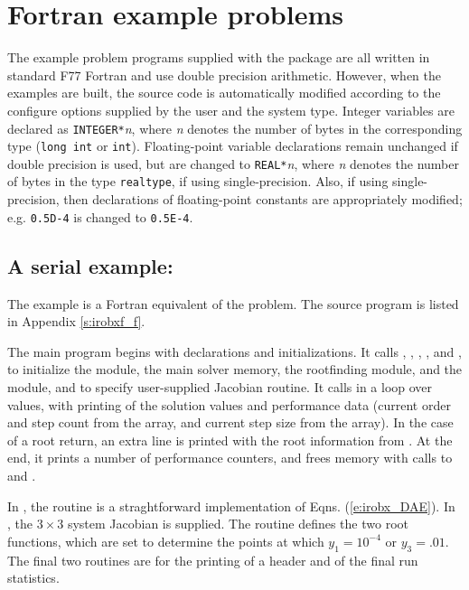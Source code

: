 \section{Fortran example problems}\label{s:ex_fortran}

The {\F} example problem programs supplied with the {\ida}
package are all written in standard F77 Fortran and use double precision
arithmetic. However, when the {\F} examples are built, the source code is
automatically modified according to the configure options supplied by the
user and the system type. Integer variables are declared as {\tt INTEGER*}{\em n},
where {\em n} denotes the number of bytes in the corresponding {\C} type
({\tt long int} or {\tt int}). Floating-point variable declarations remain
unchanged if double precision is used, but are changed to {\tt REAL*}{\em n},
where {\em n} denotes the number of bytes in the {\sundials} type {\tt realtype},
if using single-precision. Also, if using single-precision, then declarations of
floating-point constants are appropriately modified; e.g. {\tt 0.5D-4} is
changed to {\tt 0.5E-4}.


\subsection{A serial example: }\label{ss:irobxf}

The  example is a Fortran equivalent of the  problem.
The source program  is listed in Appendix \ref{s:irobxf_f}.

The main program begins with declarations and initializations.  It calls 
, , , , and
, to initialize the {\nvecs} module, the main
solver memory, the rootfinding module, and the {\idadense} module, and
to specify user-supplied Jacobian routine.
It calls  in a loop over  values, with printing of
the solution values and performance data (current order and step count
from the  array, and current step size from the  array).
In the case of a root return, an extra line is printed with the root
information from .  At the end, it prints a number of
performance counters, and frees memory with calls to 
and .

In , the  routine is a straghtforward
implementation of Eqns. (\ref{e:irobx_DAE}).  In , the 
$3 \times 3$ system Jacobian is supplied.  The  routine
defines the two root functions, which are set to determine the points at which
$y_1 = 10^{-4}$ or $y_3 = .01$.  The final two routines are for the
printing of a header and of the final run statistics.

